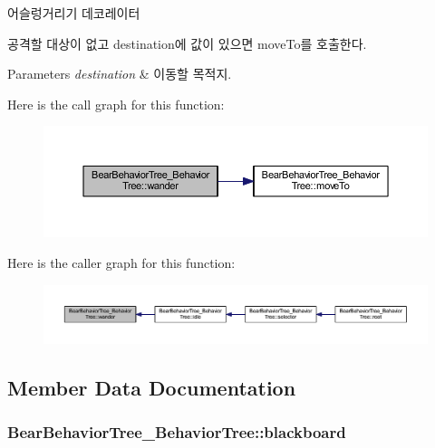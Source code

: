 어슬렁거리기 데코레이터 

공격할 대상이 없고 destination에 값이 있으면 move\+To를 호출한다. 
\begin{DoxyParams}{Parameters}
{\em destination} & 이동할 목적지. \\
\hline
\end{DoxyParams}


Here is the call graph for this function\+:
\nopagebreak
\begin{figure}[H]
\begin{center}
\leavevmode
\includegraphics[width=350pt]{class_bear_behavior_tree___behavior_tree_a0dcee292ae4de16888b71b3eafcfa6a9_cgraph}
\end{center}
\end{figure}




Here is the caller graph for this function\+:
\nopagebreak
\begin{figure}[H]
\begin{center}
\leavevmode
\includegraphics[width=350pt]{class_bear_behavior_tree___behavior_tree_a0dcee292ae4de16888b71b3eafcfa6a9_icgraph}
\end{center}
\end{figure}




\subsection{Member Data Documentation}
\subsubsection[{\texorpdfstring{blackboard}{blackboard}}]{ Bear\+Behavior\+Tree\+\_\+\+Behavior\+Tree\+::blackboard\hspace{0.3cm}{\ttfamily [private]}}\hypertarget{class_bear_behavior_tree___behavior_tree_af65805184758188534eb2100723629d7}{}\label{class_bear_behavior_tree___behavior_tree_af65805184758188534eb2100723629d7}
